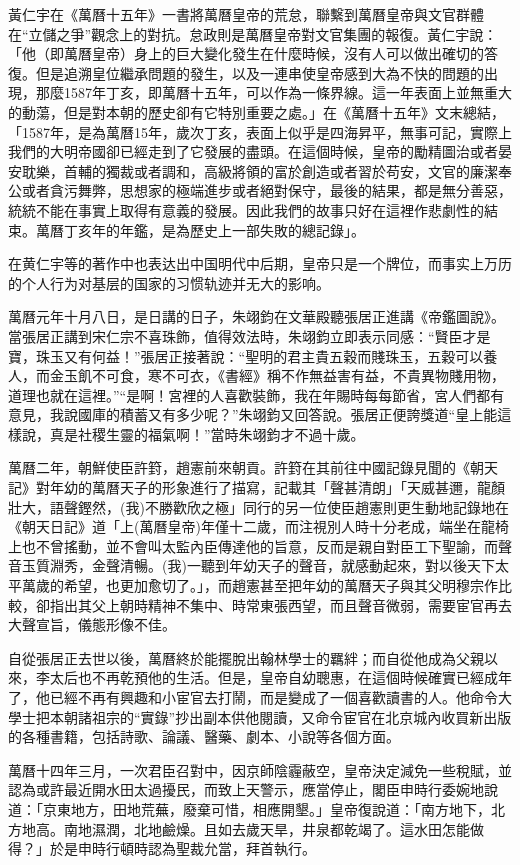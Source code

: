 黃仁宇在《萬曆十五年》一書將萬曆皇帝的荒怠，聯繫到萬曆皇帝與文官群體在“立儲之爭”觀念上的對抗。怠政則是萬曆皇帝對文官集團的報復。黃仁宇說：「他（即萬曆皇帝）身上的巨大變化發生在什麼時候，沒有人可以做出確切的答復。但是追溯皇位繼承問題的發生，以及一連串使皇帝感到大為不快的問題的出現，那麼1587年丁亥，即萬曆十五年，可以作為一條界線。這一年表面上並無重大的動蕩，但是對本朝的歷史卻有它特別重要之處。」在《萬曆十五年》文末總結，「1587年，是為萬曆15年，歲次丁亥，表面上似乎是四海昇平，無事可記，實際上我們的大明帝國卻已經走到了它發展的盡頭。在這個時候，皇帝的勵精圖治或者晏安耽樂，首輔的獨裁或者調和，高級將領的富於創造或者習於苟安，文官的廉潔奉公或者貪污舞弊，思想家的極端進步或者絕對保守，最後的結果，都是無分善惡，統統不能在事實上取得有意義的發展。因此我們的故事只好在這裡作悲劇性的結束。萬曆丁亥年的年鑑，是為歷史上一部失敗的總記錄」。

在黄仁宇等的著作中也表达出中国明代中后期，皇帝只是一个牌位，而事实上万历的个人行为对基层的国家的习惯轨迹并无大的影响。

萬曆元年十月八日，是日講的日子，朱翊鈞在文華殿聽張居正進講《帝鑑圖說》。當張居正講到宋仁宗不喜珠飾，值得效法時，朱翊鈞立即表示同感：“賢臣才是寶，珠玉又有何益！”張居正接著說：“聖明的君主貴五穀而賤珠玉，五穀可以養人，而金玉飢不可食，寒不可衣，《書經》稱不作無益害有益，不貴異物賤用物，道理也就在這裡。”“是啊！宮裡的人喜歡裝飾，我在年賜時每每節省，宮人們都有意見，我說國庫的積蓄又有多少呢？”朱翊鈞又回答說。張居正便誇獎道“皇上能這樣說，真是社稷生靈的福氣啊！”當時朱翊鈞才不過十歲。

萬曆二年，朝鮮使臣許篈，趙憲前來朝貢。許篈在其前往中國記錄見聞的《朝天記》對年幼的萬曆天子的形象進行了描寫，記載其「聲甚清朗」「天威甚邇，龍顏壯大，語聲鏗然，(我)不勝歡欣之極」同行的另一位使臣趙憲則更生動地記錄地在《朝天日記》道「上(萬曆皇帝)年僅十二歲，而注視別人時十分老成，端坐在龍椅上也不曾搖動，並不會叫太監內臣傳達他的旨意，反而是親自對臣工下聖諭，而聲音玉質淵秀，金聲清暢。(我)一聽到年幼天子的聲音，就感動起來，對以後天下太平萬歲的希望，也更加愈切了。」，而趙憲甚至把年幼的萬曆天子與其父明穆宗作比較，卻指出其父上朝時精神不集中、時常東張西望，而且聲音微弱，需要宦官再去大聲宣旨，儀態形像不佳。

自從張居正去世以後，萬曆終於能擺脫出翰林學士的羈絆；而自從他成為父親以來，李太后也不再乾預他的生活。但是，皇帝自幼聰惠，在這個時候確實已經成年了，他已經不再有興趣和小宦官去打鬧，而是變成了一個喜歡讀書的人。他命令大學士把本朝諸祖宗的“實錄”抄出副本供他閱讀，又命令宦官在北京城內收買新出版的各種書籍，包括詩歌、論議、醫藥、劇本、小說等各個方面。

萬曆十四年三月，一次君臣召對中，因京師陰霾蔽空，皇帝決定減免一些稅賦，並認為或許最近開水田太過擾民，而致上天警示，應當停止，閣臣申時行委婉地說道：「京東地方，田地荒蕪，廢棄可惜，相應開墾。」皇帝復說道：「南方地下，北方地高。南地濕潤，北地鹼燥。且如去歲天旱，井泉都乾竭了。這水田怎能做得？」於是申時行頓時認為聖裁允當，拜首執行。

